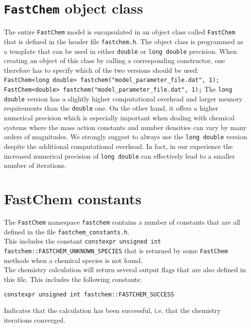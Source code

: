 \documentclass[numbers=noenddot]{aux/fcmanual}
\newcommand{\fc}{\texttt{FastChem}\xspace}
\begin{document}
\section{\fc object class}

The entire \fc model is encapsulated in an object class called \fc that is defined in the header file \verb|fastchem.h|. The object class is programmed as a template that can be used in either \verb|double| or \verb|long double| precision. When creating an object of this class by calling a corresponding constructor, one therefore has to specify which of the two versions should be used:
\bigbreak
\lstinline!  FastChem<long double> fastchem("model_parameter_file.dat", 1);!
\bigbreak
\lstinline!  FastChem<double> fastchem("model_parameter_file.dat", 1);!
\bigbreak
The \verb|long double| version has a slightly higher computational overhead and larger memory requirements than the \verb|double| one. On the other hand, it offers a higher numerical precision which is especially important when dealing with chemical systems where the mass action constants and number densities can vary by many orders of magnitudes. We strongly suggest to always use the \verb|long double| version despite the additional computational overhead. In fact, in our experience the increased numerical precision of \verb|long double| can effectively lead to a smaller number of iterations.


\section{FastChem constants}
\label{sec:fastchem_constants}

The \fc namespace \lstinline!fastchem! contains a number of constants that are all defined in the file \verb|fastchem_constants.h|.\\ This includes the constant \lstinline!constexpr unsigned int fastchem::FASTCHEM_UNKNOWN_SPECIES! that is returned by some \fc methods when a chemical species is not found. \\

The chemistry calculation will return several output flags that are also defined in this file. This includes the following constants:

\lstinline!constexpr unsigned int fastchem::FASTCHEM_SUCCESS!
\begin{addmargin}[25pt]{0pt}
  Indicates that the calculation has been successful, i.e. that the chemistry iterations converged.
\end{addmargin}
\end{document}
